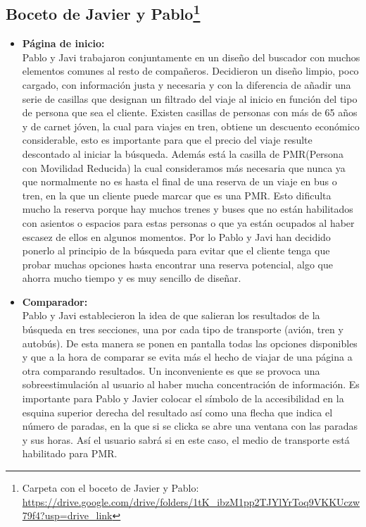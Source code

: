 \subsection[Boceto de Javier y Pablo]{Boceto de Javier y Pablo\footnote{Carpeta con el boceto de Javier y Pablo: \url{https://drive.google.com/drive/folders/1tK_ibzM1pp2TJYlYrToq9VKKUczw79f4?usp=drive_link}}}

\begin{itemize}
    \item\textbf{Página de inicio:} \\ Pablo y Javi trabajaron conjuntamente en un diseño del buscador con muchos elementos comunes al resto de compañeros. Decidieron un diseño limpio, poco cargado, con información justa y necesaria y con la diferencia de añadir una serie de casillas que designan un filtrado del viaje al inicio en función del tipo de persona que sea el cliente. Existen casillas de personas con más de 65 años y de carnet jóven, la cual para viajes en tren, obtiene un descuento económico considerable, esto es importante para que el precio del viaje resulte descontado al iniciar la búsqueda. Además está la casilla de PMR(Persona con Movilidad Reducida) la cual consideramos más necesaria que nunca ya que normalmente no es hasta el final de una reserva de un viaje en bus o tren, en la que un cliente puede marcar que es una PMR. Esto dificulta mucho la reserva porque hay muchos trenes y buses que no están habilitados con asientos o espacios para estas personas o que ya están ocupados al haber escasez de ellos en algunos momentos. Por lo Pablo y Javi han decidido ponerlo al principio de la búsqueda para evitar que el cliente tenga que probar muchas opciones hasta encontrar una reserva potencial, algo que ahorra mucho tiempo y es muy sencillo de diseñar.
    
    \item\textbf{Comparador:} \\ Pablo y Javi establecieron la idea de que salieran los resultados de la búsqueda en tres secciones, una por cada tipo de transporte (avión, tren y autobús). De esta manera se ponen en pantalla todas las opciones disponibles y que a la hora de comparar se evita más el hecho de viajar de una página a otra comparando resultados. Un inconveniente es que se provoca una sobreestimulación al usuario al haber mucha concentración de información.
    Es importante para Pablo y Javier colocar el símbolo de la accesibilidad en la esquina superior derecha del resultado así como una flecha que indica el número de paradas, en la que si se clicka se abre una ventana con las paradas y sus horas. Así el usuario sabrá si en este caso, el medio de transporte está habilitado para PMR.
    

\end{itemize}
